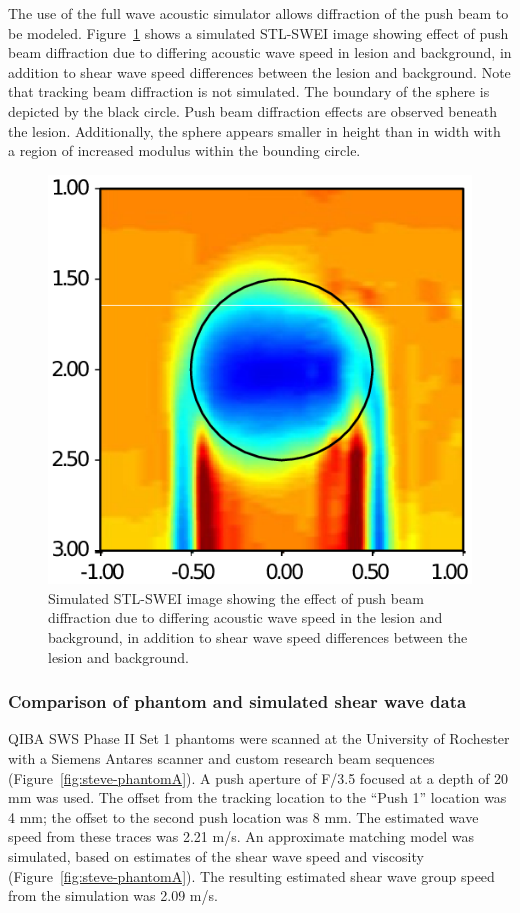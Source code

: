 The use of the full wave acoustic simulator allows diffraction of the push beam
to be modeled. Figure~\ref{fig:steve-stl-swei} shows a simulated STL-SWEI image
showing effect of push beam diffraction due to differing acoustic wave speed in
lesion and background, in addition to shear wave speed differences between the
lesion and background. Note that tracking beam diffraction is not simulated.
The boundary of the sphere is depicted by the black circle. Push beam
diffraction effects are observed beneath the lesion. Additionally, the sphere
appears smaller in height than in width with a region of increased modulus
within the bounding circle.

\begin{figure}[htb!]
    \centering
    \includegraphics[width=0.3\linewidth]{steve/figs/image15.png}
    \caption{Simulated STL-SWEI image showing the effect of push beam
    diffraction due to differing acoustic wave speed in the lesion and
    background, in addition to shear wave speed differences between the lesion
    and background.}
\label{fig:steve-stl-swei}
\end{figure}

\subsubsection{Comparison of phantom and simulated shear wave data}
QIBA SWS Phase II Set 1 phantoms were scanned at the University of Rochester
with a Siemens Antares scanner and custom research beam sequences
(Figure~\ref{fig:steve-phantomA}).  A push aperture of F/3.5 focused at a depth
of 20 mm was used. The offset from the tracking location to the ``Push 1''
location was 4 mm; the offset to the second push location was 8 mm.  The
estimated wave speed from these traces was 2.21 m/s.  An approximate matching
model was simulated, based on estimates of the shear wave speed and viscosity
(Figure~\ref{fig:steve-phantomA}). The resulting estimated shear wave group
speed from the simulation was 2.09 m/s.


